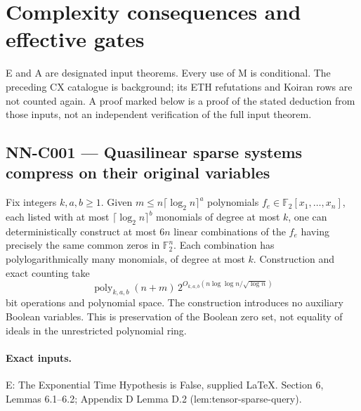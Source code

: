 \section{Complexity consequences and effective gates}
\label{sec:nn-complexity}
E and A are designated input theorems. Every use of M is conditional.
The preceding CX catalogue is background; its ETH refutations and Koiran rows
are not counted again. A proof marked below is a proof of the stated deduction
from those inputs, not an independent verification of the full input theorem.

\subsection{NN-C001 --- Quasilinear sparse systems compress on their original variables}
\begin{proposition}[NN-C001]
Fix integers $k,a,b\geq1$. Given $m\leq n\lceil\log_2 n\rceil^a$ polynomials $f_e\in\mathbb F_2[x_1,\ldots,x_n]$, each listed with at most $\lceil\log_2 n\rceil^b$ monomials of degree at most $k$, one can deterministically construct at most $6n$ linear combinations of the $f_e$ having precisely the same common zeros in $\mathbb F_2^n$. Each combination has polylogarithmically many monomials, of degree at most $k$. Construction and exact counting take
\[
 \operatorname{poly}_{k,a,b}(n+m)\,
 2^{O_{k,a,b}(n\log\log n/\sqrt{\log n})}
\]
bit operations and polynomial space. The construction introduces no auxiliary Boolean variables. This is preservation of the Boolean zero set, not equality of ideals in the unrestricted polynomial ring.
\end{proposition}
\paragraph{Exact inputs.}
E: The Exponential Time Hypothesis is False, supplied LaTeX. Section 6, Lemmas 6.1--6.2; Appendix D Lemma D.2 (lem:tensor-sparse-query).

